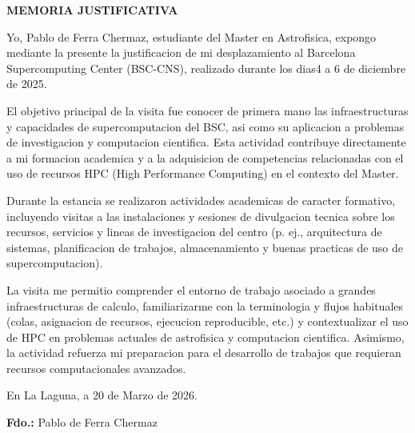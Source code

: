 \documentclass[12pt,a4paper]{article}
\begin{document}
\begin{center}
	{\Large\bfseries MEMORIA JUSTIFICATIVA}
\end{center}

Yo, Pablo de Ferra Chermaz, estudiante del Master en Astrofisica, expongo mediante la presente la justificacion de mi desplazamiento al Barcelona Supercomputing Center (BSC-CNS), realizado durante los dias4 a 6 de diciembre de 2025.

El objetivo principal de la visita fue conocer de primera mano las infraestructuras y capacidades de supercomputacion del BSC, asi como su aplicacion a problemas de investigacion y computacion cientifica. Esta actividad contribuye directamente a mi formacion academica y a la adquisicion de competencias relacionadas con el uso de recursos HPC (High Performance Computing) en el contexto del Master.

Durante la estancia se realizaron actividades academicas de caracter formativo, incluyendo visitas a las instalaciones y sesiones de divulgacion tecnica sobre los recursos, servicios y lineas de investigacion del centro (p. ej., arquitectura de sistemas, planificacion de trabajos, almacenamiento y buenas practicas de uso de supercomputacion).

La visita me permitio comprender el entorno de trabajo asociado a grandes infraestructuras de calculo, familiarizarme con la terminologia y flujos habituales (colas, asignacion de recursos, ejecucion reproducible, etc.) y contextualizar el uso de HPC en problemas actuales de astrofisica y computacion cientifica. Asimismo, la actividad refuerza mi preparacion para el desarrollo de trabajos que requieran recursos computacionales avanzados.

En La Laguna, a 20 de Marzo de 2026.

\vspace{2.2cm}

\textbf{Fdo.:} Pablo de Ferra Chermaz
\end{document}
